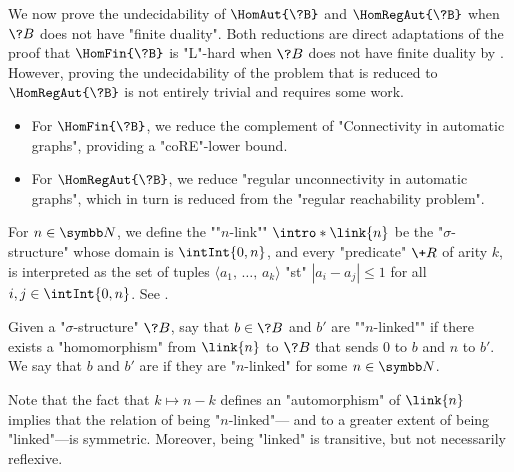 We now prove the undecidability of $\HomAut{\?B}$ and $\HomRegAut{\?B}$
when $\?B$ does not have "finite duality". Both reductions are
direct adaptations of the proof that $\HomFin{\?B}$ is "L"-hard when $\?B$ does not
have finite duality by \textcite[Theorem 3.2]{LaroseTesson2009UniversalAlgebraCSP}.
However, proving the undecidability of the problem that is reduced
to $\HomRegAut{\?B}$ is not entirely trivial and requires some work.
\begin{itemize}
	\item For $\HomFin{\?B}$, we reduce the complement of "Connectivity in automatic graphs",
		providing a "coRE"-lower bound.
	\item For $\HomRegAut{\?B}$, we reduce "regular unconnectivity in automatic graphs",
		which in turn is reduced from the "regular reachability problem".
\end{itemize}

For $n\in\N$, we define the \AP""$n$-link"" $\intro*\link{n}$ be the "$\sigma$-structure" 
whose domain is $\intInt{0,n}$, and every "predicate" $\+R$
of arity $k$, is interpreted as the set of tuples $\langle a_1,\, \dotsc,\, a_k \rangle$
"st" $|a_i-a_j| \leq 1$ for all $i,j \in \intInt{0,n}$. See .
\begin{marginfigure}
	\centering
	\begin{tikzpicture}
		
	\end{tikzpicture}
	\caption{\AP\label{fig:n-link}The "$n$-link" $\link{n}$ over the "graph signature".}
\end{marginfigure}
Given a "$\sigma$-structure" $\?B$, say that $b \in \?B$ and $b'$ are
\AP""$n$-linked"" if there exists a "homomorphism" from $\link{n}$ to $\?B$
that sends $0$ to $b$ and $n$ to $b'$. We say that $b$ and $b'$ are \AP{} if
they are "$n$-linked" for some $n \in \N$.

Note that the fact that $k \mapsto n-k$
defines an "automorphism" of $\link{n}$ implies that the relation of being "$n$-linked"---%
and to a greater extent of being "linked"---is symmetric.
Moreover, being "linked" is transitive, but not necessarily reflexive.


